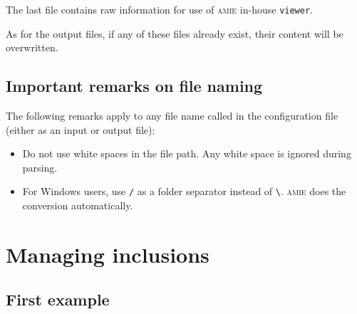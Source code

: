 \documentclass[10pt]{article}
\begin{document}
The last file contains raw information for use of \textsc{amie} in-house \verb+viewer+.

As for the output files, if any of these files already exist, their content will be overwritten.

\subsection{Important remarks on file naming}

The following remarks apply to any file name called in the configuration file (either as an input or output file):

\begin{itemize}
	\item Do not use white spaces in the file path. Any white space is ignored during parsing.
	\item For Windows users, use \verb+/+ as a folder separator instead of \verb+\+. \textsc{amie} does the conversion automatically.
\end{itemize}


\section{Managing inclusions}

\subsection{First example}
\end{document}
